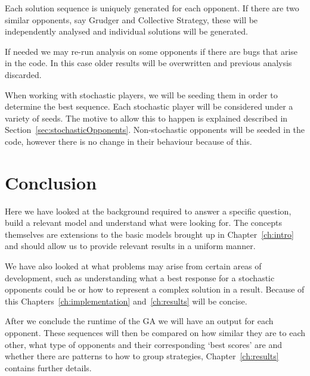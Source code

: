 Each solution sequence is uniquely generated for each opponent.
If there are two similar opponents, say Grudger and Collective Strategy, these will be independently analysed and individual solutions will be generated.

If needed we may re-run analysis on some opponents if there are bugs that arise in the code.
In this case older results will be overwritten and previous analysis discarded.

When working with stochastic players, we will be seeding them in order to determine the best sequence.
Each stochastic player will be considered under a variety of seeds.
The motive to allow this to happen is explained described in Section~\ref{sec:stochasticOpponents}. Non-stochastic opponents will be seeded in the code, however there is no change in their behaviour because of this.

\section{Conclusion}
Here we have looked at the background required to answer a specific question, build a relevant model and understand what were looking for.
The concepts themselves are extensions to the basic models brought up in Chapter~\ref{ch:intro} and should allow us to provide relevant results in a uniform manner.

We have also looked at what problems may arise from certain areas of development, such as understanding what a best response for a stochastic opponents could be or how to represent a complex solution in a result.
Because of this Chapters~\ref{ch:implementation} and~\ref{ch:results} will be concise.

After we conclude the runtime of the GA we will have an output for each opponent.
These sequences will then be compared on how similar they are to each other, what type of opponents and their corresponding `best scores' are and whether there are patterns to how to group strategies, Chapter~\ref{ch:results} contains further details.